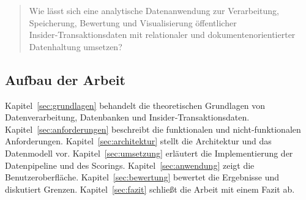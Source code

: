 \begin{quote}
  Wie lässt sich eine analytische Datenanwendung zur Verarbeitung, Speicherung, Bewertung und Visualisierung öffentlicher Insider‑Transaktionsdaten mit relationaler und dokumentenorientierter Datenhaltung umsetzen?
\end{quote}

\subsection{Aufbau der Arbeit}

Kapitel~\ref{sec:grundlagen} behandelt die theoretischen Grundlagen von Datenverarbeitung, Datenbanken und Insider‑Transaktionsdaten. Kapitel~\ref{sec:anforderungen} beschreibt die funktionalen und nicht‑funktionalen Anforderungen. Kapitel~\ref{sec:architektur} stellt die Architektur und das Datenmodell vor. Kapitel~\ref{sec:umsetzung} erläutert die Implementierung der Datenpipeline und des Scorings. Kapitel~\ref{sec:anwendung} zeigt die Benutzeroberfläche. Kapitel~\ref{sec:bewertung} bewertet die Ergebnisse und diskutiert Grenzen. Kapitel~\ref{sec:fazit} schließt die Arbeit mit einem Fazit ab.